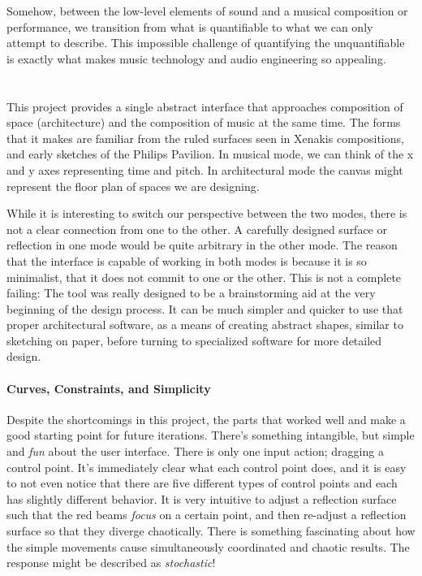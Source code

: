Somehow, between the low-level elements of sound and a musical
composition or performance, we transition from what is quantifiable to
what we can only attempt to describe. This impossible challenge of
quantifying the unquantifiable is exactly what makes music technology
and audio engineering so appealing.



\section{}
This project provides a single abstract interface that approaches
composition of space (architecture) and the composition of music at
the same time. The forms that it makes are familiar from the ruled
surfaces seen in Xenakis compositions, and early sketches of the
Philips Pavilion. In musical mode, we can think of the x and y axes
representing time and pitch. In architectural mode the canvas might
represent the floor plan of spaces we are designing.

While it is interesting to switch our perspective between the two
modes, there is not a clear connection from one to the other. A
carefully designed surface or reflection in one mode would be quite
arbitrary in the other mode. The reason that the interface is capable
of working in both modes is because it is so minimalist, that it does
not commit to one or the other. This is not a complete failing: The
tool was really designed to be a brainstorming aid at the very
beginning of the design process. It can be much simpler and quicker to
use that proper architectural software, as a means of creating
abstract shapes, similar to sketching on paper, before turning to
specialized software for more detailed design.

\paragraph{Curves, Constraints, and Simplicity} Despite
the shortcomings in this project, the parts that worked well and make
a good starting point for future iterations. There's something
intangible, but simple and \textit{fun} about the user
interface. There is only one input action; dragging a control
point. It's immediately clear what each control point does, and it is
easy to not even notice that there are five different types of control
points and each has slightly different behavior. It is very intuitive
to adjust a reflection surface such that the red beams \textit{focus}
on a certain point, and then re-adjust a reflection surface so that
they diverge chaotically. There is something fascinating about how the
simple movements cause simultaneously coordinated and chaotic
results. The response might be described as \textit{stochastic}!

